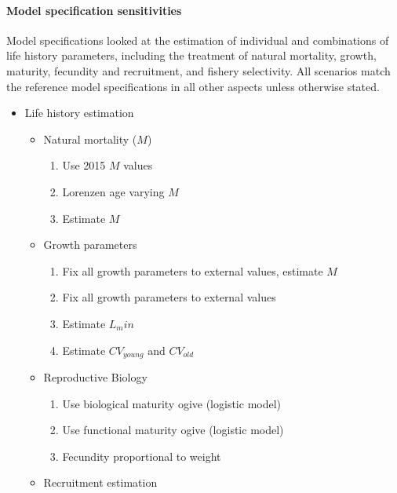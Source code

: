 \documentclass[11pt,
  english,
  letterpaper,
]{article}
\providecommand{\tightlist}{%
  \setlength{\itemsep}{0pt}\setlength{\parskip}{0pt}}
\providecommand{\tightlist}{%
  \setlength{\itemsep}{0pt}\setlength{\parskip}{0pt}}
\begin{document}
\hypertarget{model-specification-sensitivities}{%
\paragraph{Model specification sensitivities}\label{model-specification-sensitivities}}

Model specifications looked at the estimation of individual and combinations of life history parameters, including the treatment of natural mortality, growth, maturity, fecundity and recruitment, and fishery selectivity. All scenarios match the reference model specifications in all other aspects unless otherwise stated.

\begin{itemize}
\item
  Life history estimation

  \begin{itemize}
  \tightlist
  \item
    Natural mortality (\(M\))

    \begin{enumerate}
    \def\labelenumi{\arabic{enumi}.}
    \tightlist
    \item
      Use 2015 \(M\) values
    \item
      Lorenzen age varying \(M\)
    \item
      Estimate \(M\)
    \end{enumerate}
  \item
    Growth parameters

    \begin{enumerate}
    \def\labelenumi{\arabic{enumi}.}
    \setcounter{enumi}{3}
    \tightlist
    \item
      Fix all growth parameters to external values, estimate \(M\)
    \item
      Fix all growth parameters to external values
    \item
      Estimate \(L_min\)
    \item
      Estimate \(CV_{young}\) and \(CV_{old}\)
    \end{enumerate}
  \item
    Reproductive Biology

    \begin{enumerate}
    \def\labelenumi{\arabic{enumi}.}
    \setcounter{enumi}{7}
    \tightlist
    \item
      Use biological maturity ogive (logistic model)
    \item
      Use functional maturity ogive (logistic model)
    \item
      Fecundity proportional to weight
    \end{enumerate}
  \item
    Recruitment estimation


\end{itemize}
\end{itemize}
\end{document}
